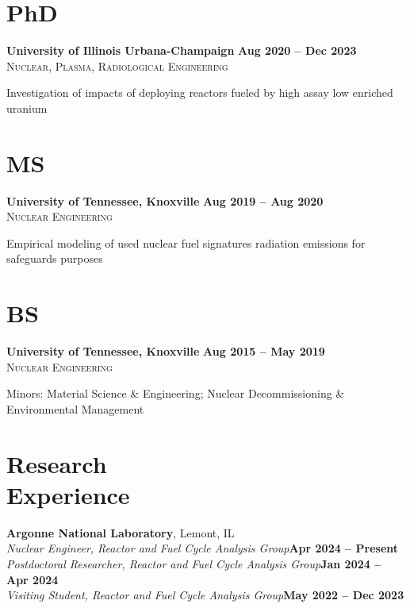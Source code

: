 \documentclass[margin,line]{resume}
\begin{document}
\begin{resume}
    \section{\mysidestyle PhD}
    \textbf{University of Illinois Urbana-Champaign} \hfill \textbf{Aug 2020 -- Dec 2023}\\%
    \textsc{Nuclear, Plasma, Radiological Engineering}\hfill
    \begin{list2}
        \item Investigation of impacts of deploying reactors fueled by high 
        assay low enriched uranium
    \end{list2}\vspace{-4mm}
    
    \section{\mysidestyle MS}
    \textbf{University of Tennessee, Knoxville} \hfill\textbf{Aug 2019 -- Aug 2020}\\%
    \textsc{Nuclear Engineering}\hfill
    \begin{list2}
        \item Empirical modeling of used nuclear fuel signatures radiation emissions for safeguards purposes
    \end{list2}\vspace{-4mm}
    \section{\mysidestyle BS}
    \textbf{University of Tennessee, Knoxville} \hfill\textbf{Aug 2015 -- May 2019}\\%
    \textsc{Nuclear Engineering}\hfill
    \begin{list2}
        \item Minors: Material Science \& Engineering; Nuclear Decommissioning \& 
              Environmental Management
    \end{list2}\vspace{-5mm}
    
    \section{\mysidestyle Research\\Experience}
    \textbf{Argonne National Laboratory}, Lemont, IL\\
    \vspace{0mm}
        \textsl{Nuclear Engineer, Reactor and Fuel Cycle Analysis Group}\hfill\textbf{Apr 2024 -- Present}\\\vspace{0mm}
        \textsl{Postdoctoral Researcher, Reactor and Fuel Cycle Analysis Group}\hfill\textbf{Jan 2024 -- Apr 2024}\\\vspace{-2mm}
        \textsl{Visiting Student, Reactor and Fuel Cycle Analysis Group}\hfill\textbf{May 2022 -- Dec 2023}\\\vspace{-6mm}


\end{resume}
\end{document}
